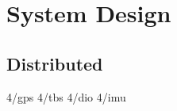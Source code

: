 
\chapter{System Design} %
\label{sec:design}


\ifpdf
    \graphicspath{{4/figures/PNG/}{4/figures/PDF/}{4/figures/}}
\else
    \graphicspath{{4/figures/EPS/}{4/figures/}}
\fi


\section{Distributed}



 {4/gps}
 {4/tbs}
 {4/dio}
 {4/imu}




